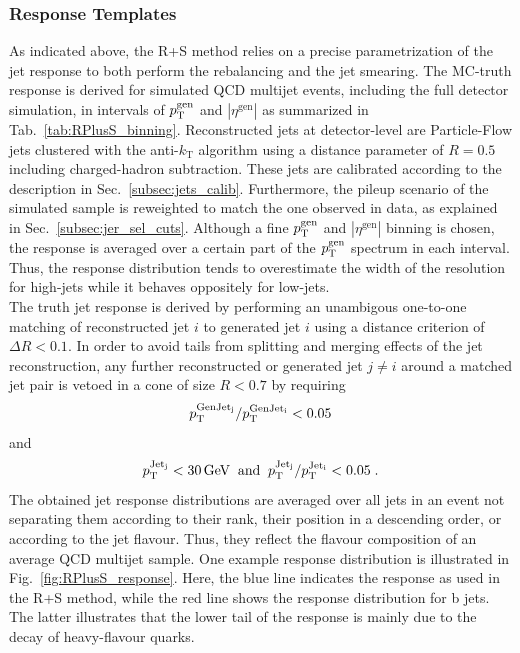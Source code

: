  \subsubsection*{Response Templates}
\label{subsubsec:qcd_response}
As indicated above, the R+S method relies on a precise parametrization of the jet response to both perform the rebalancing and the jet smearing. The MC-truth response is derived for simulated QCD multijet events, including the full detector simulation, in intervals of $p_{\text{T}}^\mathrm{gen}$ and $|\eta^\mathrm{gen}|$ as summarized in Tab.~\ref{tab:RPlusS_binning}. Reconstructed jets at detector-level are Particle-Flow jets clustered with the anti-$k_\mathrm{T}$ algorithm using a distance parameter of $R = 0.5$ including charged-hadron subtraction. These jets are calibrated according to the description in Sec.~\ref{subsec:jets_calib}. Furthermore, the pileup scenario of the simulated sample is reweighted to match the one observed in data, as explained in Sec.~\ref{subsec:jer_sel_cuts}. Although a fine $p_{\text{T}}^\mathrm{gen}$ and $|\eta^\mathrm{gen}|$ binning is chosen, the response is averaged over a certain part of the $p_{\text{T}}^\mathrm{gen}$ spectrum in each interval. Thus, the response distribution tends to overestimate the width of the resolution for high-\pt jets while it behaves oppositely for low-\pt jets. \\
The truth jet response is derived by performing an unambigous one-to-one matching of reconstructed jet $i$ to generated jet $i$ using a distance criterion of $\Delta R < 0.1$. In order to avoid tails from splitting and merging effects of the jet reconstruction, any further reconstructed or generated jet $j \ne i$ around a matched jet pair is vetoed in a cone of size $R < 0.7$ by requiring
\begin{equation}
 p_{\text{T}}^{\rm{GenJet}_j} / p_{\text{T}}^{\rm{GenJet}_i} < 0.05
\end{equation} 
and
\begin{equation}
 p_{\text{T}}^{\rm{Jet}_j} < 30\,\mathrm{GeV} \;\; \mathrm{and} \;\; p_{\text{T}}^{\rm{Jet}_j} / p_{\text{T}}^{\rm{Jet}_i} < 0.05 \; .
\end{equation} 
The obtained jet response distributions are averaged over all jets in an event not separating them according to their rank, \ie their position in a descending \pt order, or according to the jet flavour. Thus, they reflect the flavour composition of an average QCD multijet sample. One example response distribution is illustrated in Fig.~\ref{fig:RPlusS_response}. Here, the blue line indicates the response as used in the R+S method, while the red line shows the response distribution for b jets. The latter illustrates that the lower tail of the response is mainly due to the decay of heavy-flavour quarks.
